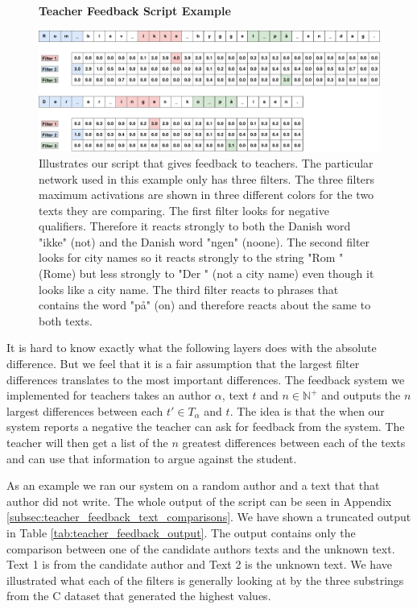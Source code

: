 \begin{figure}
    \centering
    \textbf{Teacher Feedback Script Example}\par\medskip
    \includegraphics[width=\textwidth]{./pictures/discussion/teacher_feedback_example}
    \caption{Illustrates our script that gives feedback to teachers. The
        particular network used in this example only has three filters. The
        three filters maximum activations are shown in three different colors
        for the two texts they are comparing. The first filter looks for
        negative qualifiers. Therefore it reacts strongly to both the Danish
        word "ikke" (not) and the Danish word "ngen" (noone). The second filter
        looks for city names so it reacts strongly to the string "Rom " (Rome)
        but less strongly to "Der " (not a city name) even though it looks like
        a city name. The third filter reacts to phrases that contains the word
        "p\aa " (on) and therefore reacts about the same to both texts.}
    \label{fig:feature_extraction_output_example}
\end{figure}

It is hard to know exactly what the following layers does with the absolute
difference. But we feel that it is a fair assumption that the largest filter
differences translates to the most important differences. The feedback system
we implemented for teachers takes an author $\alpha$, text $t$ and $n \in
\mathbb{N}^+$ and outputs the $n$ largest differences between each $t' \in
T_\alpha$ and $t$. The idea is that the when our system reports a negative the
teacher can ask for feedback from the system. The teacher will then get a list
of the $n$ greatest differences between each of the texts and can use that
information to argue against the student.

As an example we ran our system on a random author and a text that that
author did not write. The whole output of the script can be seen in Appendix
\ref{subsec:teacher_feedback_text_comparisons}. We have shown a truncated output
in Table \ref{tab:teacher_feedback_output}. The output contains only the
comparison between one of the candidate authors texts and the unknown text. Text
1 is from the candidate author and Text 2 is the unknown text. We have
illustrated what each of the filters is generally looking at by the three
substrings from the \gls{C} dataset that generated the highest values.


